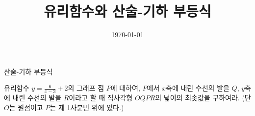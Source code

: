 \documentclass[a4paper]{oblivoir}
\title{유리함수와 산술-기하 부등식}
\date{\today}
\author{}
\begin{document}
\begin{center}
 산술-기하 부등식
\end{center}

\bigskip
\begin{mdframed}[leftmargin=.2\textwidth,rightmargin=.2\textwidth]
\begin{spacing}{1.7}
유리함수 \(\displaystyle y=\frac6{x-3}+2\)의 그래프 점 \(P\)에 대하여, \(P\)에서 \(x\)축에 내린 수선의 발을 \(Q\), \(y\)축에 내린 수선의 발을 \(R\)이라고 할 때 직사각형 \(OQPR\)의 넓이의 최솟값을 구하여라.
(단 \(O\)는 원점이고 \(P\)는 제 1사분면 위에 있다.)
\end{spacing}
\vspace{0pt}
\end{mdframed}
\bigskip\bigskip
\end{document}
